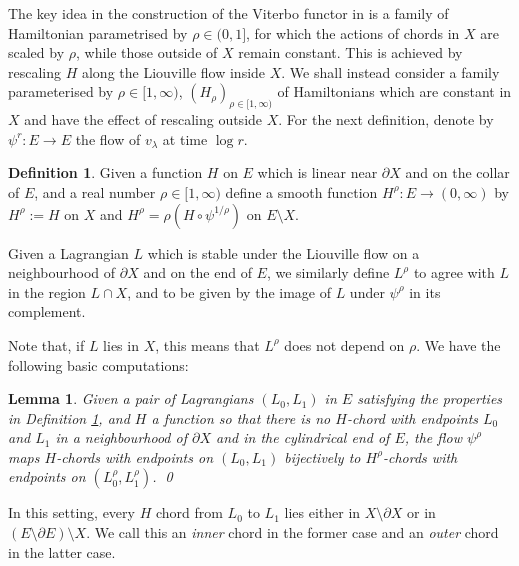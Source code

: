 \documentclass{article}
\theoremstyle{plain}%
\newtheorem{lem}[thm]{Lemma}
\theoremstyle{definition}
\newtheorem{dfn}[thm]{Definition}
\numberwithin{equation}{section}
\numberwithin{figure}{section}
\def\l{\label}
\def\la{\lambda}
\def\ps{\psi}
\def\-{\setminus}
\def\iy{\infty}
\def\cm{\circ}
\begin{document}
The key idea in the construction of the Viterbo functor in \cite[\S4]{AS} is a family of Hamiltonian parametrised by $\rho \in (0,1]$, for which the actions of chords in $X$ are scaled by $\rho$, while those outside of $X$ remain constant. This is achieved by rescaling $H$ along the Liouville flow inside $X$. We shall instead consider a family parameterised by  $\rho \in [1,\infty)$,  $(H_\rho)_{\rho\in[1,\iy)}$ of Hamiltonians which are constant in $X$ and have the effect of rescaling outside $X$. For the next definition, denote by $\ps^r:E\to E$ the flow of $v_\la$ at time $\log r.$
\begin{dfn}\l{dfn: H^rho}
   Given a function $H$ on $E$ which is linear near $\partial X$ and on the collar of $E$, and a real number $\rho\in[1,\infty)$ define a smooth function $H^\rho:E\to(0,\iy)$ by $H^\rho:=H$ on $X$ and $H^\rho = \rho(H\cm \ps^{1/\rho})$ on %
   $E\-X.$

   Given a Lagrangian $L$ which is stable under the Liouville flow on a neighbourhood of $\partial X$ and on the end of $E$, we similarly define $L^{\rho}$ to agree with $L$ in the region $L \cap X$, and to be given by the image of $L$ under $\ps^{\rho}$ in its complement.
\end{dfn}
Note that, if $L$ lies in $X$, this means that $L^\rho$ does not depend on $\rho$. We have the following basic computations:
\begin{lem}
  Given a pair of Lagrangians $(L_0,L_1)$ in $E$ satisfying the properties in Definition \ref{dfn: H^rho}, and $H$ a function so that there is no $H$-chord with endpoints $L_0$ and $L_1$ in a neighbourhood of $\partial X$ and in the cylindrical end of $E$, the flow $\psi^\rho$ maps $H$-chords with endpoints on $(L_0,L_1)$ bijectively to  $H^\rho$-chords with endpoints on $(L^\rho_0,L^\rho_1)$. \qed
\end{lem}
In this setting, every $H$ chord from $L_0$ to $L_1$ lies either in $X\-\partial X$ or in $(E\-\partial E)\- X.$ We call this an {\it inner} chord in the former case and an {\it outer} chord in the latter case.
\end{document}

